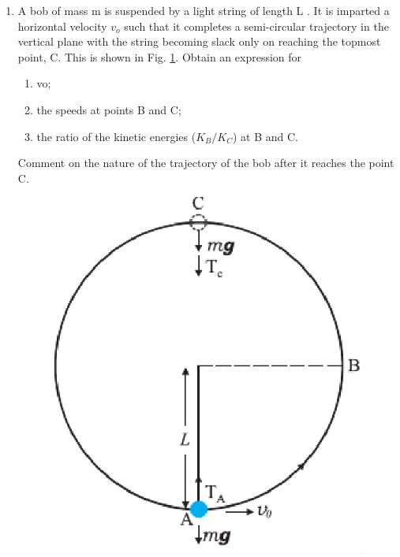\begin{enumerate}[label=\arabic*.,ref=\thesubsection.\theenumi]
\item A bob of mass m is suspended by a light string of length L . It is imparted a horizontal velocity $v_o$
such that it completes a semi-circular trajectory in the vertical plane with the string becoming slack only on reaching the topmost point, C. This is shown in Fig. \ref{fig:6.6}. Obtain an expression for 
\begin{enumerate}
\item  vo; 
\item  the speeds at points B and C; 
\item  the ratio of the kinetic energies ($K_B/K_C$) at B and C. 
\end{enumerate}
Comment on the nature
of the trajectory of the bob after it reaches the point C.
\begin{figure}[!ht]
\includegraphics[width=\columnwidth]{./figs/11-1/6/6.6.eps}
\caption{}
\label{fig:6.6}
\end{figure}
\end{enumerate}
